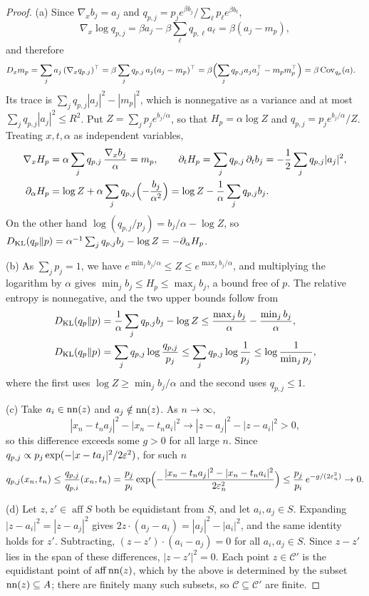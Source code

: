\documentclass{article} %
\newcommand{\iclrstart}{\begin{aligned}&}\newcommand{\iclrend}{\end{aligned}}
\newcommand{\iclrallow}{\allowbreak}
\newcommand{\iclrstart}{}\newcommand{\iclrend}{}\newcommand{\iclrallow}{}
\theoremstyle{plain}
\theoremstyle{definition}
\theoremstyle{remark}
\begin{document}
\begin{proof}
(a) Since $\nabla_xb_j=a_j$ and $q_{p,j}=p_je^{\beta b_j}/\sum_\ell p_\ell e^{\beta b_\ell}$,
\[
\nabla_x\log q_{p,j}=\beta a_j-\beta\sum_\ell q_{p,\ell}a_\ell=\beta(a_j-m_p),
\]
and therefore
\[
\iclrstart D_xm_p=\sum_ja_j\,(\nabla_xq_{p,j})^\top=\beta\sum_jq_{p,j}\,a_j(a_j-m_p)^\top
\iclrbrq=\beta\Bigl(\sum_jq_{p,j}a_ja_j^\top-m_pm_p^\top\Bigr)=\beta\Cov_{q_p}(a).\iclrend
\]
Its trace is $\sum_jq_{p,j}|a_j|^2-|m_p|^2$, which is nonnegative as a variance and at most
$\sum_jq_{p,j}|a_j|^2\le R^2$. Put $Z=\sum_jp_je^{b_j/\alpha}$, so that $H_p=\alpha\log Z$ and
$q_{p,j}=p_je^{b_j/\alpha}/Z$. Treating $x,t,\alpha$ as independent variables,
\begin{align*}
\nabla_xH_p&=\alpha\sum_jq_{p,j}\,\frac{\nabla_xb_j}{\alpha}=m_p,\qquad
\partial_tH_p=\sum_jq_{p,j}\,\partial_tb_j=-\frac12\sum_jq_{p,j}|a_j|^2,\\
\partial_\alpha H_p&=\log Z+\alpha\sum_jq_{p,j}\Bigl(-\frac{b_j}{\alpha^2}\Bigr)
=\log Z-\frac1\alpha\sum_jq_{p,j}b_j .
\end{align*}
On the other hand $\log(q_{p,j}/p_j)=b_j/\alpha-\log Z$, so
$D_{\rm KL}(q_p\Vert p)=\alpha^{-1}\sum_jq_{p,j}b_j-\log Z=-\partial_\alpha H_p$.

(b) As $\sum_jp_j=1$, we have $e^{\min_jb_j/\alpha}\le Z\le e^{\max_jb_j/\alpha}$, and multiplying
the logarithm by $\alpha$ gives $\min_jb_j\le H_p\le\max_jb_j$, a bound free of $p$. The relative
entropy is nonnegative, and the two upper bounds follow from
\begin{align*}
D_{\rm KL}(q_p\Vert p)&=\frac1\alpha\sum_jq_{p,j}b_j-\log Z
\le\frac{\max_jb_j}{\alpha}-\frac{\min_jb_j}{\alpha},\\
D_{\rm KL}(q_p\Vert p)&=\sum_jq_{p,j}\log\frac{q_{p,j}}{p_j}
\le\sum_jq_{p,j}\log\frac1{p_j}\le\log\frac1{\min_jp_j},
\end{align*}
where the first uses $\log Z\ge\min_jb_j/\alpha$ and the second uses $q_{p,j}\le1$.

(c) Take $a_i\in\operatorname{nn}(z)$ and $a_j\notin\operatorname{nn}(z)$. As $n\to\infty$,
\[
|x_n-t_na_j|^2-|x_n-t_na_i|^2\longrightarrow|z-a_j|^2-|z-a_i|^2>0,
\]
so this difference exceeds some $g>0$ for all large $n$. Since
$q_{p,j}\propto p_j\exp(-|x-ta_j|^2/2\varepsilon^2)$, for such $n$
\begin{equation}
q_{p,j}(x_n,t_n)\le\frac{q_{p,j}}{q_{p,i}}(x_n,t_n)
=\frac{p_j}{p_i}\exp\Bigl(-\frac{|x_n-t_na_j|^2-|x_n-t_na_i|^2}{2\varepsilon_n^2}\Bigr)
\le\frac{p_j}{p_i}\,e^{-g/(2\varepsilon_n^2)}\to0 .
\label{eq:pf:int:conc}
\end{equation}

(d) Let $z,z'\in\operatorname{aff}S$ both be equidistant from $S$, and let $a_i,a_j\in S$. Expanding
$|z-a_i|^2=|z-a_j|^2$ gives $2z\cdot(a_j-a_i)=|a_j|^2-|a_i|^2$, and the same identity holds for
$z'$. Subtracting, $(z-z')\cdot(a_i-a_j)=0$ for all $a_i,a_j\in S$. Since $z-z'$ lies in the span of
these differences, $|z-z'|^2=0$. Each point $z\in\mathcal C'$ is the equidistant point of
$\operatorname{aff}\operatorname{nn}(z)$, which by the above is determined by the subset $\operatorname{nn}(z)\subseteq A$;
there are finitely many such subsets, so $\mathcal C\subseteq\mathcal C'$ are finite.
\end{proof}
\end{document}
